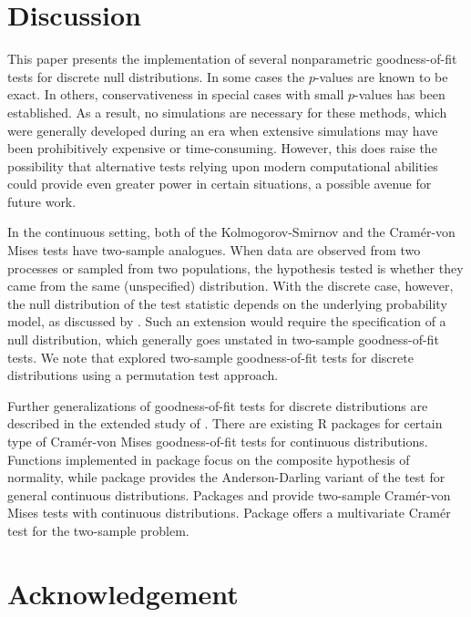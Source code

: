 \section{Discussion}

This paper presents the implementation of several nonparametric
goodness-of-fit tests for discrete null distributions.  
In some cases the $p$-values are known to be exact.  In others,
conservativeness in special cases with small $p$-values
has been established.  As a result,
no simulations are necessary for these methods, which were generally
developed during an era when extensive simulations may have been
prohibitively expensive or time-consuming.
However, this does raise the possibility that alternative tests relying upon
modern computational abilities could provide even greater power in certain
situations, a possible avenue for future work.

In the continuous setting, both of 
the Kolmogorov-Smirnov and the Cram\'{e}r-von Mises tests
have two-sample analogues. When data are
observed from two processes or sampled from two populations, 
the hypothesis tested is 
whether they came from the same (unspecified) distribution. 
With the discrete case, however, the null distribution of the
test statistic depends on the underlying
probability model, as discussed by \cite{walsh1963}.
Such an extension would require the specification of a
null distribution, which generally goes unstated in two-sample
goodness-of-fit tests.  We note that
\cite{Mdufour2001} explored two-sample goodness-of-fit tests for
discrete distributions using a permutation test approach.

Further 
generalizations of goodness-of-fit tests for discrete distributions
are described in the extended study of \cite{dewev1973}.  There are
existing R packages for certain type of Cram\'{e}r-von Mises 
goodness-of-fit tests for continuous distributions.
Functions implemented in package  
\citep{nortest} focus on the
composite hypothesis of normality, while
package  \citep{ADGofTest} provides the Anderson-Darling variant
of the test for general continuous distributions.  Packages
 \citep{CvM2SL1Test} and  
\citep{CvM2SL2Test} provide
two-sample Cram\'{e}r-von Mises tests with continuous distributions.
Package  \citep{cramer} offers a multivariate Cram\'{e}r test for
the two-sample problem.


\section{Acknowledgement}

